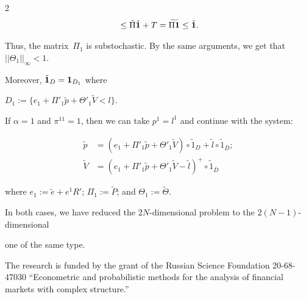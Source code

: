 \begin{multicols}{2}
\begin{multline*}
{}\le\tilde \Pi \tilde {\bf 1} + T =\widetilde {\Pi{\bf 1}}\le \tilde {\bf 1}. 

\end{multline*}

Thus, the matrix~$\Pi_1$ is substochastic. By the same arguments, we get that $||\Theta_1||_\infty<1$.

Moreover,  $ \tilde {\bf 1}_{D}={\bf 1}_{D_1}$ where 

$D_1 := \{ e_1 + \Pi'_1\tilde  p + \Theta'_1 \tilde V <  l  \}$. 

 



If $\alpha=1$ and $\pi^{11}=1$, then we can take $p^1=l^1$ and continue with the system:  

\begin{align*}

\tilde p&=\left(e_1 +  \Pi'_1 \tilde p + \Theta'_1 \tilde V\right) \circ \tilde 1_{D} + \tilde l \circ \tilde 1_{\bar D}; \\

\tilde V&= \left(e_1 + \Pi'_1 \tilde p + \Theta'_1 \tilde V - \tilde l\right)^+ \circ \tilde 1_{\bar D}  

\end{align*}

where $e_1:=\tilde e+e^1R'$; $ \Pi_1:=\tilde P$; and $\Theta_1:=\tilde \Theta$.



\pagebreak



In both cases,  we have reduced the $2N$-dimensional problem to the $2(N-1)$-dimensional 

one of the same type. 



\vspace*{-12pt}





\Ack



\vspace*{-4pt}



\noindent

The research is funded by the grant of the Russian Science Foundation 20-68-47030 ``Econometric and probabilistic methods for the analysis of financial markets with complex structure.''

 






\end{multicols}
